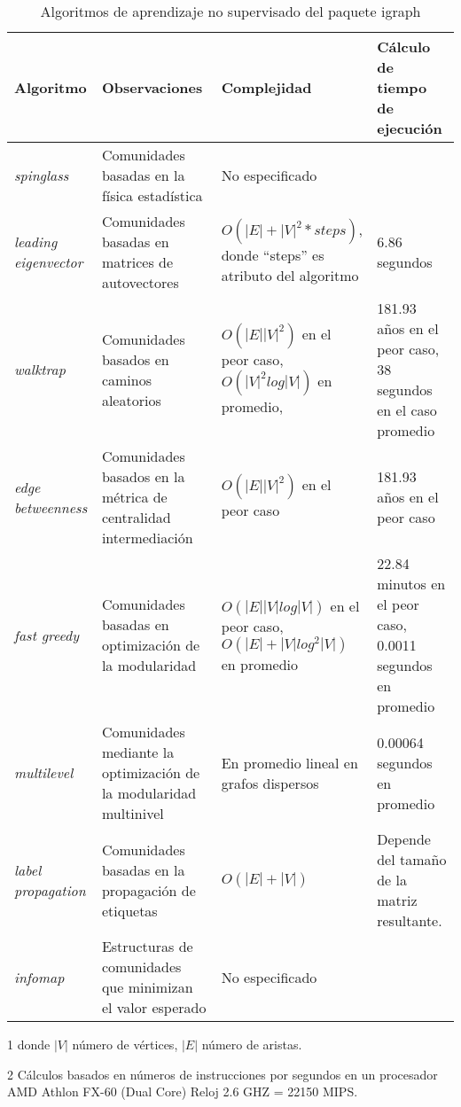 \begin{table}[tbp]
\centering
\caption{Algoritmos de aprendizaje no supervisado del paquete igraph}
\label{algoritmos_igraph}
\begin{threeparttable}
\begin{tabularx}{\textwidth}{@{}XXXX@{}}
\toprule
Algoritmo & Observaciones & Complejidad\tnote{1}  & Cálculo de tiempo de ejecución\tnote{2} \\ \midrule
\textit{spinglass} & Comunidades basadas en la física estadística & No especificado &  \\
\textit{leading} \newline  \textit{eigenvector} & Comunidades basadas en matrices de autovectores & $O(|E|+|V|^2*steps)$, donde “steps” es atributo del algoritmo & 6.86 segundos \\
\textit{walktrap} & Comunidades basados en caminos aleatorios & $O(|E||V|^2)$ en el peor caso, $O(|V|^2 log|V|)$ en promedio, & 181.93 años en el peor caso, 38 segundos en el caso promedio \\
\textit{edge} \newline \textit{betweenness} & Comunidades basados en la métrica de centralidad intermediación & $O(|E||V|^2)$ en el peor caso & 181.93 años en el peor caso \\
\textit{fast greedy} & Comunidades basadas en optimización de la modularidad & $O(|E||V|log|V|)$ en el peor caso, $O(|E|+|V|log^2|V|)$ en promedio & 22.84 minutos en el peor caso, 0.0011 segundos en promedio \\
\textit{multilevel} & Comunidades mediante la optimización de la modularidad multinivel & En promedio lineal en grafos dispersos & 0.00064 segundos en promedio \\
\textit{label} \newline  \textit{propagation} & Comunidades basadas en la propagación de etiquetas & $O(|E|+|V|)$ & Depende del tamaño de la matriz resultante. \\
\textit{infomap} & Estructuras de comunidades que minimizan el valor esperado & No especificado &  \\ \bottomrule
\end{tabularx}
\begin{tablenotes}
    \item[1] donde $|V|$ número de vértices, $|E|$ número de aristas.
    \item[2] Cálculos basados en números de instrucciones por segundos en un procesador AMD Athlon FX-60 (Dual Core) Reloj 2.6 GHZ = 22150 MIPS.
  \end{tablenotes}
\end{threeparttable}
\end{table}

